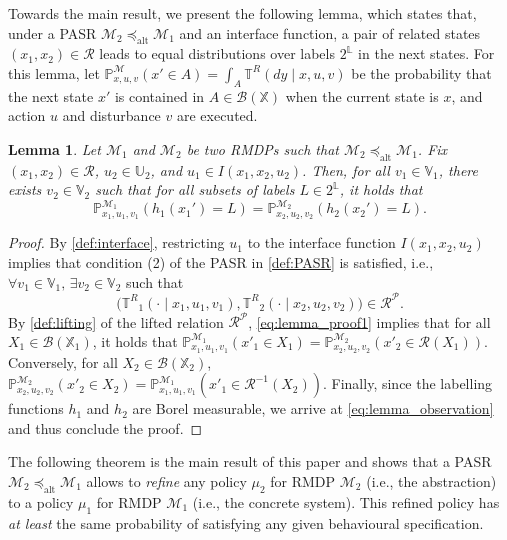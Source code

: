 \documentclass[letterpaper, 10 pt, conference]{ieeeconf}  %
\newtheorem{lemma}{Lemma}
\newcommand*{\policy}{\ensuremath{\mu}}
\newcommand*{\States}{\ensuremath{\mathbb{X}}}
\newcommand*{\Actions}{\ensuremath{\mathbb{U}}}
\newcommand*{\Disturb}{\ensuremath{\mathbb{V}}}
\newcommand*{\Labels}{\ensuremath{\mathbb{L}}}
\newcommand*{\transfuncR}{\ensuremath{\mathbb{T}^R}}
\newcommand*{\rmdp}{{\ensuremath{\mathcal{M}}}}
\newcommand*{\inv}{\ensuremath{{-1}}}
\newcommand*{\Relation}{\mathcal{R}}
\newcommand*{\liftRelation}{\mathcal{R}^\mathcal{P}}
\newcommand*{\Relinv}[1]{\Relation^\inv({#1})}
\newcommand*{\Prob}{\mathbb{P}}
\newcommand*{\Borel}[1]{\ensuremath{\mathcal{B}(#1)}}
\begin{document}
Towards the main result, we present the following lemma, which states that, under a PASR $\rmdp_2 \preceq_\text{alt} \rmdp_1$ and an interface function, a pair of related states $(x_1, x_2) \in \Relation$ leads to equal distributions over labels $2^\Labels$ in the next states.
For this lemma, let $\Prob^\rmdp_{x,u,v}(x' \in A) = \int_A \transfuncR(dy \mid x, u, v)$ be the probability that the next state $x'$ is contained in $A \in \Borel{\States}$ when the current state is $x$, and action $u$ and disturbance $v$ are executed.

\begin{lemma}
    \label{lemma:observations}
    Let $\rmdp_1$ and $\rmdp_2$ be two RMDPs such that $\rmdp_2 \preceq_\text{alt} \rmdp_1$.
    Fix $(x_1, x_2) \in \Relation$, $u_2 \in \Actions_2$, and $u_1 \in I(x_1, x_2, u_2)$.
    Then, for all $v_1 \in \Disturb_1$, there exists $v_2 \in \Disturb_2$ such that for all subsets of labels $L \in 2^\Labels$, it holds that
    \begin{equation}
        \label{eq:lemma_observation}
        \Prob^{\rmdp_1}_{x_1,u_1,v_1}(h_1(x_1') = L) = 
        \Prob^{\rmdp_2}_{x_2,u_2,v_2}(h_2(x_2') = L).
    \end{equation}
\end{lemma}

\begin{proof}
    By \cref{def:interface}, restricting $u_1$ to the interface function $I(x_1, x_2, u_2)$ implies that condition (2) of the PASR in \cref{def:PASR} is satisfied, i.e., $\forall v_1 \in \Disturb_1, \, \exists v_2 \in \Disturb_2$ such that
    \begin{equation}
        \label{eq:lemma_proof1}
        \big( \transfuncR_1(\cdot \mid x_1, u_1, v_1), \transfuncR_2(\cdot \mid x_2, u_2, v_2) \big) \in \liftRelation.
    \end{equation}
    By \cref{def:lifting} of the lifted relation $\liftRelation$, \cref{eq:lemma_proof1} implies that for all $X_1 \in \Borel{\States_1}$, it holds that
    $
    \Prob^{\rmdp_1}_{x_1,u_1,v_1}(x'_1 \in X_1) = \Prob^{\rmdp_2}_{x_2,u_2,v_2}(x'_2 \in \Relation(X_1)).
    $
    Conversely, for all $X_2 \in \Borel{\States_2}$,
    $
    \Prob^{\rmdp_2}_{x_2,u_2,v_2}(x'_2 \in X_2) = \Prob^{\rmdp_1}_{x_1,u_1,v_1}(x'_1 \in \Relinv{X_2}).
    $
    Finally, since the labelling functions $h_1$ and $h_2$ are Borel measurable, we arrive at \cref{eq:lemma_observation} and thus conclude the proof.
\end{proof}

The following theorem is the main result of this paper and shows that a PASR $\rmdp_2 \preceq_\text{alt} \rmdp_1$ allows to \emph{refine} any policy $\policy_2$ for RMDP $\rmdp_2$ (i.e., the abstraction) to a policy $\policy_1$ for RMDP $\rmdp_1$ (i.e., the concrete system).
This refined policy has \emph{at least} the same probability of satisfying any given behavioural specification.
\end{document}
